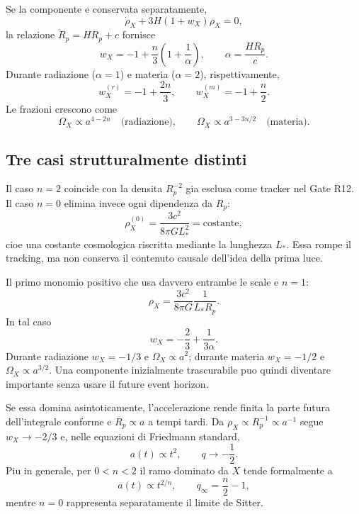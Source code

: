 \documentclass[11pt,a4paper]{article}
\begin{document}
Se la componente e conservata separatamente,
\begin{equation}
 \dot\rho_X+3H(1+w_X)\rho_X=0,
\end{equation}
la relazione $\dot R_p=HR_p+c$ fornisce
\begin{equation}
 \boxed{\quad
 w_X=-1+\frac{n}{3}\left(1+\frac1\alpha\right),
 \qquad \alpha=\frac{HR_p}{c}.
 \quad}
 \label{eq:r12c_w}
\end{equation}
Durante radiazione ($\alpha=1$) e materia ($\alpha=2$), rispettivamente,
\begin{equation}
 w_X^{(r)}=-1+\frac{2n}{3},
 \qquad
 w_X^{(m)}=-1+\frac n2.
\end{equation}
Le frazioni crescono come
\begin{equation}
 \Omega_X\propto a^{4-2n}
 \quad\text{(radiazione)},
 \qquad
 \Omega_X\propto a^{3-3n/2}
 \quad\text{(materia)}.
 \label{eq:r12c_growth_eras}
\end{equation}

\subsection{Tre casi strutturalmente distinti}

Il caso $n=2$ coincide con la densita $R_p^{-2}$ gia esclusa come tracker nel Gate R12. Il caso $n=0$ elimina invece ogni dipendenza da $R_p$:
\begin{equation}
 \rho_X^{(0)}=\frac{3c^2}{8\pi G L_*^2}=\mathrm{costante},
\end{equation}
cioe una costante cosmologica riscritta mediante la lunghezza $L_*$. Essa rompe il tracking, ma non conserva il contenuto causale dell'idea della prima luce.

Il primo monomio positivo che usa davvero entrambe le scale e $n=1$:
\begin{equation}
 \boxed{\quad
 \rho_X=\frac{3c^2}{8\pi G}\frac{1}{L_*R_p}.
 \quad}
 \label{eq:r12c_n1_density}
\end{equation}
In tal caso
\begin{equation}
 w_X=-\frac23+\frac{1}{3\alpha}.
 \label{eq:r12c_n1_w}
\end{equation}
Durante radiazione $w_X=-1/3$ e $\Omega_X\propto a^2$; durante materia $w_X=-1/2$ e $\Omega_X\propto a^{3/2}$. Una componente inizialmente trascurabile puo quindi diventare importante senza usare il future event horizon.

Se essa domina asintoticamente, l'accelerazione rende finita la parte futura dell'integrale conforme e $R_p\propto a$ a tempi tardi. Da $\rho_X\propto R_p^{-1}\propto a^{-1}$ segue $w_X\to-2/3$ e, nelle equazioni di Friedmann standard,
\begin{equation}
 \boxed{\quad a(t)\propto t^2,\qquad q\to-\frac12.\quad}
 \label{eq:r12c_n1_attractor}
\end{equation}
Piu in generale, per $0<n<2$ il ramo dominato da $X$ tende formalmente a
\begin{equation}
 a(t)\propto t^{2/n},
 \qquad
 q_\infty=\frac n2-1,
 \label{eq:r12c_general_attractor}
\end{equation}
mentre $n=0$ rappresenta separatamente il limite de Sitter.
\end{document}
